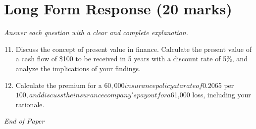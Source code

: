 \documentclass[12pt]{article}
\begin{document}
\section*{Long Form Response (20 marks)}
\textit{Answer each question with a clear and complete explanation.}
\begin{enumerate}[label=\arabic*.]
\setcounter{enumi}{10}
\item Discuss the concept of present value in finance. Calculate the present value of a cash
flow of \$100 to be received in 5 years with a discount rate of 5\%, and analyze the
implications of your findings.
\item Calculate the premium for a $60,000 insurance policy at a rate of $0.2065 per $100, and
discuss the insurance company's payout for a $61,000 loss, including your rationale.
\end{enumerate}

\vfill
\noindent\textit{End of Paper}
\end{document}
